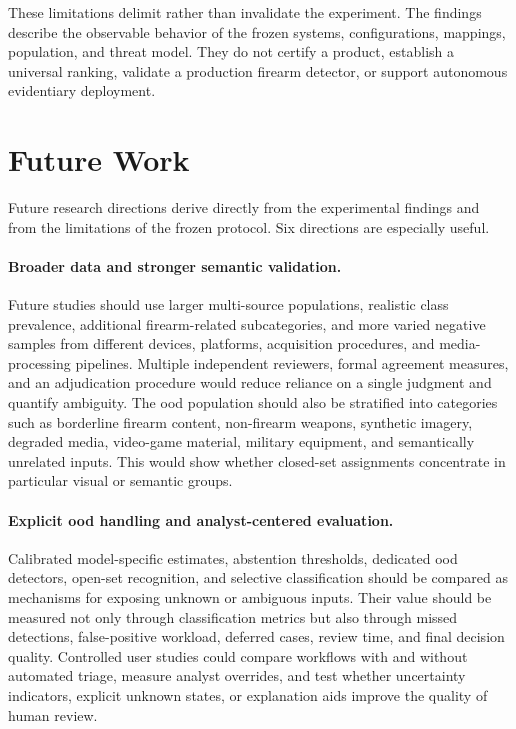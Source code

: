These limitations delimit rather than invalidate the experiment. The findings
describe the observable behavior of the frozen systems, configurations,
mappings, population, and threat model. They do not certify a product,
establish a universal ranking, validate a production firearm detector, or
support autonomous evidentiary deployment.


\section{Future Work}
\label{sec:conclusions-future-work}

Future research directions derive directly from the experimental findings and
from the limitations of the frozen protocol. Six directions are especially
useful.

\paragraph{Broader data and stronger semantic validation.}
Future studies should use larger multi-source populations, realistic class
prevalence, additional firearm-related subcategories, and more varied negative
samples from different devices, platforms, acquisition procedures, and
media-processing pipelines. Multiple independent reviewers, formal agreement
measures, and an adjudication procedure would reduce reliance on a single
judgment and quantify ambiguity. The \gls{ood} population should also be
stratified into categories such as borderline firearm content, non-firearm
weapons, synthetic imagery, degraded media, video-game material, military
equipment, and semantically unrelated inputs. This would show whether closed-set
assignments concentrate in particular visual or semantic groups.

\paragraph{Explicit \gls{ood} handling and analyst-centered evaluation.}
Calibrated model-specific estimates, abstention thresholds, dedicated
\gls{ood} detectors, open-set recognition, and selective classification should
be compared as mechanisms for exposing unknown or ambiguous inputs. Their value
should be measured not only through classification metrics but also through
missed detections, false-positive workload, deferred cases, review time, and
final decision quality. Controlled user studies could compare workflows with
and without automated triage, measure analyst overrides, and test whether
uncertainty indicators, explicit unknown states, or explanation aids improve
the quality of human review.

